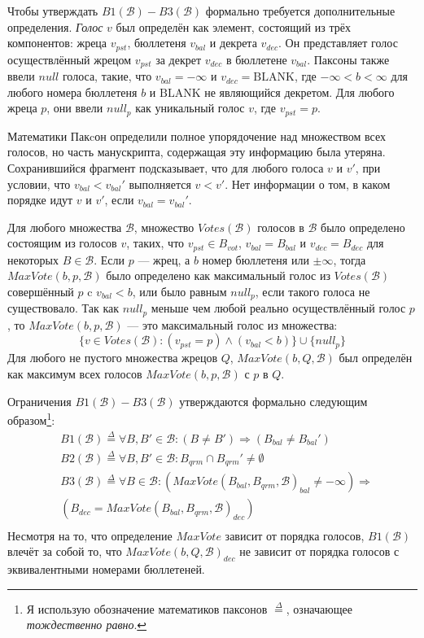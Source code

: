 \documentclass[12pt, a4paper]{article} %
\begin{document}
Чтобы утверждать $B1(\mathcal{B}) - B3(\mathcal{B})$ формально требуется дополнительные определения. \textit{Голос} $v$ был определён как элемент, состоящий из трёх компонентов: жреца $v_{pst}$, бюллетеня $v_{bal}$ и декрета $v_{dec}$. Он представляет голос осуществлённый жрецом $v_{pst}$ за декрет $v_{dec}$ в бюллетене $v_{bal}$. Паксоны также ввели $null$ голоса, такие, что $v_{bal}=-\infty$ и $v_{dec}=\mathrm{BLANK}$, где $-\infty < b < \infty$ для любого номера бюллетеня $b$ и $\mathrm{BLANK}$ не являющийся декретом. Для любого жреца $p$, они ввели $null_p$ как уникальный голос $v$, где $v_{pst}=p$.

Математики Пакcон определили полное упорядочение над множеством всех голосов, но часть манускрипта, содержащая эту информацию была утеряна. Сохранившийся фрагмент подсказывает, что для любого голоса $v$ и $v'$, при условии, что $v_{bal} < v_{bal}'$ выполняется $v < v'$. Нет информации о том, в каком порядке идут $v$ и $v'$, если $v_{bal} = v_{bal}'$.

Для любого множества $\mathcal{B}$, множество $Votes(\mathcal{B})$ голосов в $\mathcal{B}$ было определено состоящим из голосов $v$, таких, что $v_{pst} \in B_{vot}$, $v_{bal} = B_{bal}$ и $v_{dec} = B_{dec}$ для некоторых $B \in \mathcal{B}$. Если $p$ --- жрец, а $b$ номер бюллетеня или $\pm \infty$, тогда $MaxVote(b, p, \mathcal{B})$ было определено как максимальный голос из $Votes(\mathcal{B})$ совершённый $p$ c $v_{bal} < b$, или было равным $null_p$, если такого голоса не существовало. Так как $null_p$ меньше чем любой реально осуществлённый голос $p$, то $MaxVote(b,p, \mathcal{B})$ --- это максимальный голос из множества:
\[  
    \{v \in Votes(\mathcal{B}) : (v_{pst} = p) \land (v_{bal} < b)\} \cup \{null_p\}
\]
Для любого не пустого множества жрецов $Q$, $MaxVote(b, Q, \mathcal{B})$ был определён как максимум всех голосов $MaxVote(b, p, \mathcal{B})$ с $p$ в $Q$.

Ограничения  $B1(\mathcal{B}) - B3(\mathcal{B})$ утверждаются формально следующим образом\footnote{Я использую обозначение математиков паксонов $\overset{\Delta}{=}$, означающее \textit{тождественно равно}.}:
\begin{align*}
    &B1(\mathcal{B}) \overset{\Delta}{=} \forall B, B' \in \mathcal{B} : (B \neq B') \Rightarrow (B_{bal} \neq B_{bal}') \\
    &B2(\mathcal{B}) \overset{\Delta}{=} \forall B, B' \in \mathcal{B} : B_{qrm} \cap B_{qrm}' \neq \emptyset \\
    &B3(\mathcal{B}) \overset{\Delta}{=} \forall B \in \mathcal{B} : (MaxVote(B_{bal}, B_{qrm}, \mathcal{B})_{bal} \neq - \infty) \Rightarrow \\
    &(B_{dec} = MaxVote(B_{bal}, B_{qrm}, \mathcal{B})_{dec}) \\
\end{align*}
Несмотря на то, что определение $MaxVote$ зависит от порядка голосов, $B1(\mathcal{B})$ влечёт за собой то, что $MaxVote(b, Q, \mathcal{B})_{dec}$ не зависит от порядка голосов с эквивалентными номерами бюллетеней.
\end{document}
